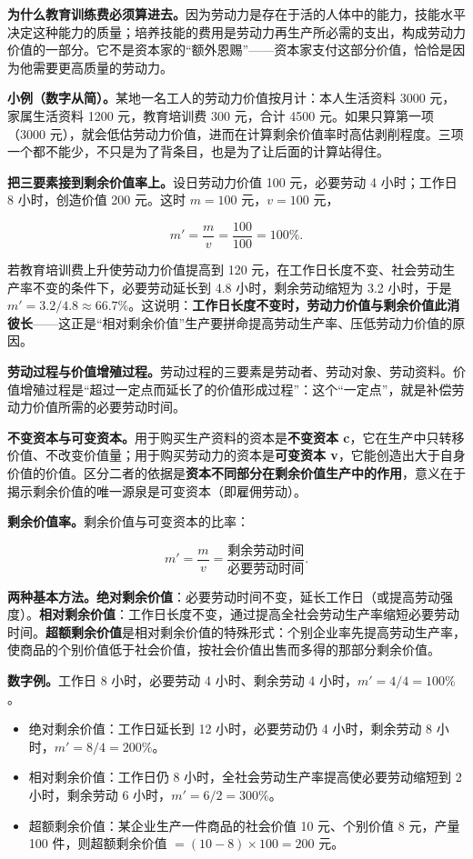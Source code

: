 \documentclass[11pt]{ctexart}
\newcommand{\dw}[1]{\textbf{\color{violetdeep}#1}}   %
\let\origsubhdr\subhdr
\renewcommand{\subhdr}[1]{\par\needspace{4\baselineskip}\origsubhdr{#1}}
\begin{document}
\textbf{为什么教育训练费必须算进去。}因为劳动力是存在于活的人体中的能力，技能水平决定这种能力的质量；培养技能的费用是劳动力再生产所必需的支出，构成劳动力价值的一部分。它不是资本家的“额外恩赐”——资本家支付这部分价值，恰恰是因为他需要更高质量的劳动力。

\textbf{小例（数字从简）。}某地一名工人的劳动力价值按月计：本人生活资料 3000 元，家属生活资料 1200 元，教育培训费 300 元，合计 4500 元。如果只算第一项（3000 元），就会低估劳动力价值，进而在计算剩余价值率时高估剥削程度。三项一个都不能少，不只是为了背条目，也是为了让后面的计算站得住。

\textbf{把三要素接到剩余价值率上。}设日劳动力价值 100 元，必要劳动 4 小时；工作日 8 小时，创造价值 200 元。这时 $m=100$ 元，$v=100$ 元，

\[
m'=\frac{m}{v}=\frac{100}{100}=100\%.
\]

若教育培训费上升使劳动力价值提高到 120 元，在工作日长度不变、社会劳动生产率不变的条件下，必要劳动延长到 4.8 小时，剩余劳动缩短为 3.2 小时，于是 $m'=3.2/4.8\approx 66.7\%$。这说明：\dw{工作日长度不变时，劳动力价值与剩余价值此消彼长}——这正是“相对剩余价值”生产要拼命提高劳动生产率、压低劳动力价值的原因。


\textbf{劳动过程与价值增殖过程。}劳动过程的三要素是劳动者、劳动对象、劳动资料。价值增殖过程是“超过一定点而延长了的价值形成过程”：这个“一定点”，就是补偿劳动力价值所需的必要劳动时间。

\textbf{不变资本与可变资本。}用于购买生产资料的资本是\dw{不变资本 c}，它在生产中只转移价值、不改变价值量；用于购买劳动力的资本是\dw{可变资本 v}，它能创造出大于自身价值的价值。区分二者的依据是\dw{资本不同部分在剩余价值生产中的作用}，意义在于揭示剩余价值的唯一源泉是可变资本（即雇佣劳动）。

\textbf{剩余价值率。}剩余价值与可变资本的比率：

\[
m'=\frac{m}{v}=\frac{\text{剩余劳动时间}}{\text{必要劳动时间}}.
\]

\textbf{两种基本方法。}\dw{绝对剩余价值}：必要劳动时间不变，延长工作日（或提高劳动强度）。\dw{相对剩余价值}：工作日长度不变，通过提高全社会劳动生产率缩短必要劳动时间。\dw{超额剩余价值}是相对剩余价值的特殊形式：个别企业率先提高劳动生产率，使商品的个别价值低于社会价值，按社会价值出售而多得的那部分剩余价值。

\textbf{数字例。}工作日 8 小时，必要劳动 4 小时、剩余劳动 4 小时，$m'=4/4=100\%$。

\begin{itemize}[leftmargin=1.9em]
\item 绝对剩余价值：工作日延长到 12 小时，必要劳动仍 4 小时，剩余劳动 8 小时，$m'=8/4=200\%$。
\item 相对剩余价值：工作日仍 8 小时，全社会劳动生产率提高使必要劳动缩短到 2 小时，剩余劳动 6 小时，$m'=6/2=300\%$。
\item 超额剩余价值：某企业生产一件商品的社会价值 10 元、个别价值 8 元，产量 100 件，则超额剩余价值 $=(10-8)\times100=200$ 元。
\end{itemize}
\end{document}

